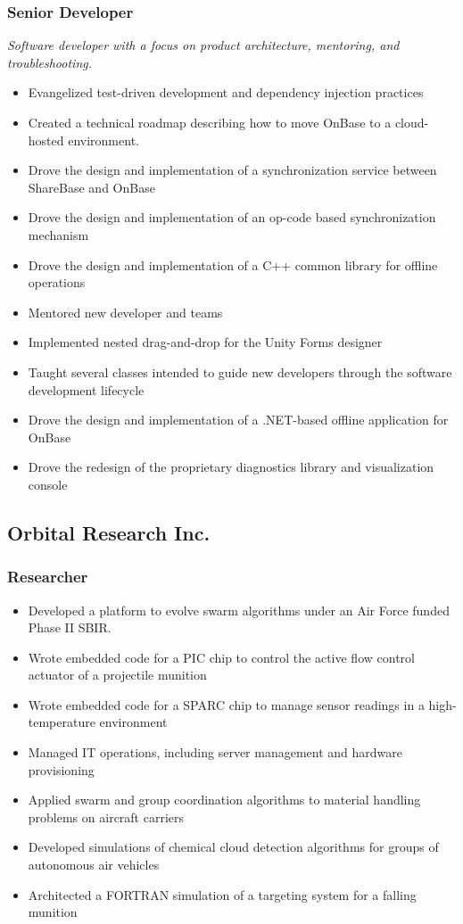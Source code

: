 \documentclass{cv_style}
\begin{document}
			\subsubsection*{Senior Developer}
			\textit{Software developer with a focus on product architecture, mentoring, and troubleshooting.}
			\begin{itemize}
				\item Evangelized test-driven development and dependency injection practices
				\item Created a technical roadmap describing how to move OnBase to a cloud-hosted environment.
				\item Drove the design and implementation of a synchronization service between ShareBase and OnBase
				\item Drove the design and implementation of an op-code based synchronization mechanism
				\item Drove the design and implementation of a C++ common library for offline operations
				\item Mentored new developer and teams
				\item Implemented nested drag-and-drop for the Unity Forms designer
				\item Taught several classes intended to guide new developers through the software development lifecycle
				\item Drove the design and implementation of a .NET-based offline application for OnBase
				\item Drove the redesign of the proprietary diagnostics library and visualization console
			\end{itemize}

		\subsection{Orbital Research Inc.}
			\subsubsection*{Researcher}
			\begin{itemize}
				\item Developed a platform to evolve swarm algorithms under an Air Force funded Phase II SBIR.
				\item Wrote embedded code for a PIC chip to control the active flow control actuator of a projectile munition 
				\item Wrote embedded code for a SPARC chip to manage sensor readings in a high-temperature environment
				\item Managed IT operations, including server management and hardware provisioning
				\item Applied swarm and group coordination algorithms to material handling problems on aircraft carriers
				\item Developed simulations of chemical cloud detection algorithms for groups of autonomous air vehicles
				\item Architected a FORTRAN simulation of a targeting system for a falling munition
			\end{itemize}
\end{document}
